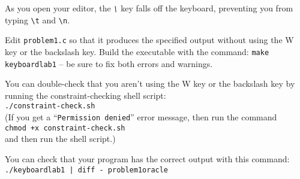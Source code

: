 As you open your editor, the \textit{\texttt{\textbackslash}} key falls off the keyboard, preventing you from typing \texttt{\textbackslash t} and \texttt{\textbackslash n}.

Edit \texttt{problem1.c} so that it produces the specified output without using the W key or the backslash key.
Build the executable with the command: \texttt{make keyboardlab1} -- be sure to fix both errors and warnings.

You can double-check that you aren't using the W key or the backslash key by running the constraint-checking shell script: \\
\texttt{./constraint-check.sh} \\
(If you get a ``\texttt{Permission denied}'' error message, then run the command \\
\texttt{chmod +x constraint-check.sh} \\
and then run the shell script.)

You can check that your program has the correct output with this command: \\
\texttt{./keyboardlab1 | diff - problem1oracle}
